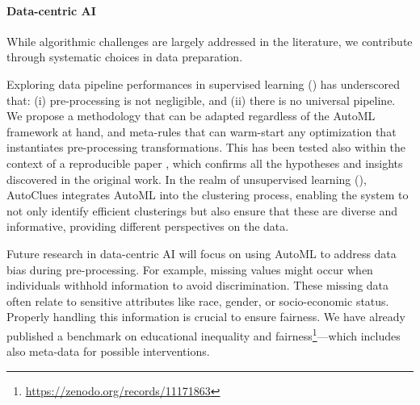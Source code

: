\paragraph{Data-centric AI}
While algorithmic challenges are largely addressed in the literature, we contribute through systematic choices in data preparation.

Exploring data pipeline performances in supervised learning () has underscored that: (i) pre-processing is not negligible, and (ii) there is no universal pipeline.
We propose a methodology that can be adapted regardless of the AutoML framework at hand, and meta-rules that can warm-start any optimization that instantiates pre-processing transformations.
This has been tested also within the context of a reproducible paper \cite{giovanelli2023reproducible}, which confirms all the hypotheses and insights discovered in the original work.
In the realm of unsupervised learning (), AutoClues integrates AutoML into the clustering process, enabling the system to not only identify efficient clusterings but also ensure that these are diverse and informative, providing different perspectives on the data.

Future research in data-centric AI will focus on using AutoML to address data bias during pre-processing. For example, missing values might occur when individuals withhold information to avoid discrimination. These missing data often relate to sensitive attributes like race, gender, or socio-economic status. Properly handling this information is crucial to ensure fairness. We have already published a benchmark on educational inequality and fairness\footnote{\url{https://zenodo.org/records/11171863}}---which includes also meta-data for possible interventions.

